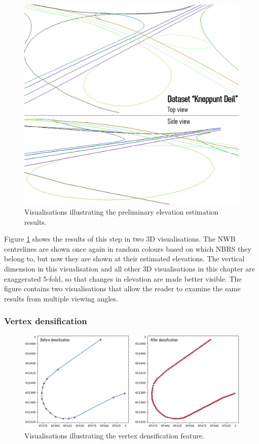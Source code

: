 \begin{figure}
    \centering
    \includegraphics[width=\linewidth]{final_report/figs/elevationestimation0.png}
    \caption{Visualisations illustrating the preliminary elevation estimation results.}
    \label{fig:elevationestimation0}
\end{figure}

Figure \ref{fig:elevationestimation0} shows the results of this step in two 3D visualisations. The NWB centrelines are shown once again in random colours based on which NBRS they belong to, but now they are shown at their estimated elevations. The vertical dimension in this visualisation and all other 3D visualisations in this chapter are exaggerated 5-fold, so that changes in elevation are made better visible. The figure contains two visualisations that allow the reader to examine the same results from multiple viewing angles.

\subsubsection{Vertex densification}

\begin{figure}
    \centering
    \includegraphics[width=\linewidth]{final_report/figs/elevationestimation1.png}
    \caption{Visualisations illustrating the vertex densification feature.}
    \label{fig:elevationestimation1}
\end{figure}

